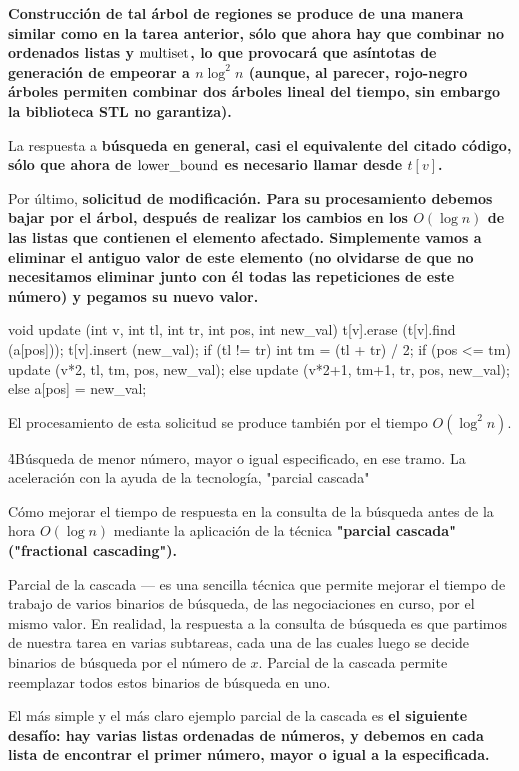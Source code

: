 \bf{Construcción} de tal árbol de regiones se produce de una manera similar como en la tarea anterior, sólo que ahora hay que combinar no ordenados listas y $\rm multiset$, lo que provocará que asíntotas de generación de empeorar a $n \log^2 n$ (aunque, al parecer, rojo-negro árboles permiten combinar dos árboles lineal del tiempo, sin embargo la biblioteca STL no garantiza).

La respuesta a \bf{búsqueda} en general, casi el equivalente del citado código, sólo que ahora de $\rm lower\_bound$ es necesario llamar desde $t[v]$.

Por último, \bf{solicitud de modificación}. Para su procesamiento debemos bajar por el árbol, después de realizar los cambios en los $O (\log n)$ de las listas que contienen el elemento afectado. Simplemente vamos a eliminar el antiguo valor de este elemento (no olvidarse de que no necesitamos eliminar junto con él todas las repeticiones de este número) y pegamos su nuevo valor.

\code
void update (int v, int tl, int tr, int pos, int new_val) {
t[v].erase (t[v].find (a[pos]));
t[v].insert (new_val);
if (tl != tr) {
int tm = (tl + tr) / 2;
if (pos <= tm)
update (v*2, tl, tm, pos, new_val);
else
update (v*2+1, tm+1, tr, pos, new_val);
}
else
a[pos] = new_val;
}
\endcode

El procesamiento de esta solicitud se produce también por el tiempo $O (\log^2 n)$.

\h4{Búsqueda de menor número, mayor o igual especificado, en ese tramo. La aceleración con la ayuda de la tecnología, "parcial cascada"}

Cómo mejorar el tiempo de respuesta en la consulta de la búsqueda antes de la hora $O (\log n)$ mediante la aplicación de la técnica \bf{"parcial cascada"} ("fractional cascading").

Parcial de la cascada --- es una sencilla técnica que permite mejorar el tiempo de trabajo de varios binarios de búsqueda, de las negociaciones en curso, por el mismo valor. En realidad, la respuesta a la consulta de búsqueda es que partimos de nuestra tarea en varias subtareas, cada una de las cuales luego se decide binarios de búsqueda por el número de $x$. Parcial de la cascada permite reemplazar todos estos binarios de búsqueda en uno.

El más simple y el más claro ejemplo parcial de la cascada es \bf{el siguiente desafío}: hay varias listas ordenadas de números, y debemos en cada lista de encontrar el primer número, mayor o igual a la especificada.


